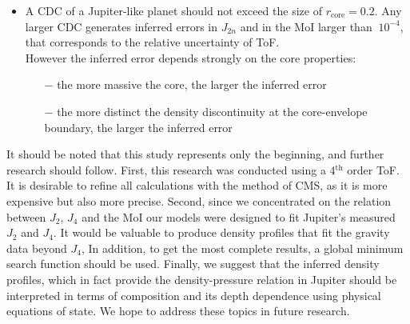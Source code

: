 \documentclass[usenatbib]{mnras}
\newcommand\bncomment[1]{\textcolor{green}{BN: #1}}
\newcommand{\sub}[1]{_{\text{#1}}}
\begin{document}
\begin{itemize}[
  align=left,
  leftmargin=1.4em,
  itemindent=0pt,
  labelsep=0pt,
  labelwidth=1.4em
]
\item A CDC of a Jupiter-like planet should not exceed the size of $r\sub{core} = 0.2$. Any larger CDC generates inferred errors in $J_{2n}$ and in the MoI larger than $~10^{-4}$, that corresponds to the relative uncertainty of ToF. \\
However the inferred error depends strongly on the core properties:
    \begin{enumerate}[leftmargin=0.3cm, labelwidth = 0cm, itemindent=0cm,labelsep = 6pt]
        \item[$-$] the more massive the core, the larger the inferred error 
        \item[$-$] the more distinct the density discontinuity at the core-envelope boundary, the larger the inferred error
    \end{enumerate}{}
    

\end{itemize}

It should be noted that this study represents only the beginning, and further research should follow. 
First, this research was conducted using a 4$^{\text{th}}$ order ToF. It is desirable to refine all calculations with the method of CMS, as it is more expensive but also more precise. 
Second, since we concentrated on the relation between $J_2$, $J_4$ and the MoI our models were designed to fit Jupiter's measured $J_2$ and $J_4$. It would be valuable to produce density profiles that fit the gravity data beyond $J_4$, %
In addition, to get the most complete results, a global minimum search function should be used. 
Finally, we suggest that the inferred density profiles, which in fact provide the density-pressure relation in Jupiter should be interpreted in terms of composition and its depth dependence using physical equations of state. We hope to address these topics in future research. 
\end{document}
